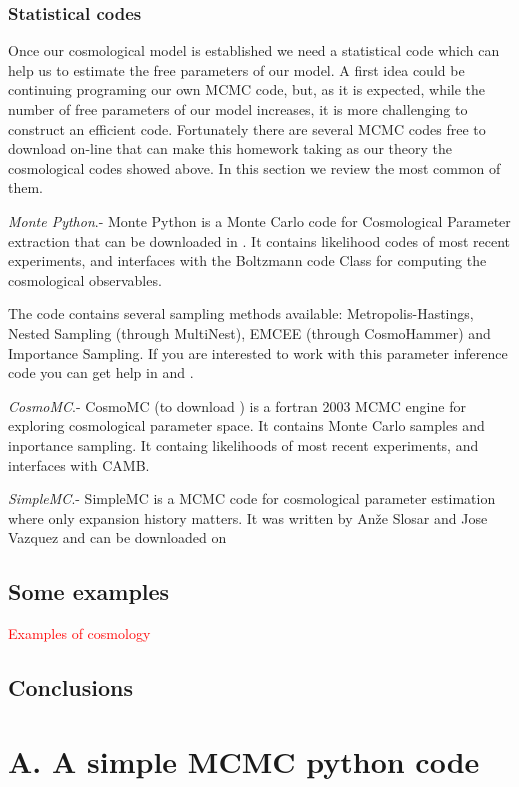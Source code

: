 \documentclass[onecolumn,           %
               showpacs,            %
               preprintnumbers,     %
               aps,                 %
               prl,          	    %
               letterpaper,             %
               superscriptaddress,      %
               nofootinbib,         %
               tightenlines,        %
               floats,floatfix      %
               ,usenatbib,
               ]{revtex4-1}
\begin{document}
\subsubsection{Statistical codes}

Once our cosmological model is established we need a statistical code which can help us to estimate the free parameters of our model. A first idea could be continuing programing our own MCMC code, but, as it is expected, while the number of free parameters of our model increases, it is more challenging to construct an efficient code. Fortunately there are several MCMC codes free to download on-line that can make this homework taking as our theory the cosmological codes showed above. In this section we review the most common of them.

\textit{Monte Python}.-
Monte Python is a Monte Carlo code for Cosmological Parameter extraction  that can be downloaded in \cite{MP1}. It contains likelihood codes of most recent experiments, and interfaces with the Boltzmann code Class for computing the cosmological observables.

The code contains several sampling methods available: Metropolis-Hastings, Nested Sampling (through MultiNest), EMCEE (through CosmoHammer) and Importance Sampling. If you are interested to work with this parameter inference code you can get help in \cite{mont1} and \cite{MP2}.

\textit{CosmoMC}.- CosmoMC (to download \cite{cosmomc}) is a fortran 2003 MCMC engine for exploring cosmological parameter space. It contains Monte Carlo samples and inportance sampling. It containg likelihoods of most recent experiments, and interfaces with CAMB.

\textit{SimpleMC}.- SimpleMC is a MCMC code for cosmological parameter estimation where only expansion history matters. It was written by Anže Slosar and Jose Vazquez and can be downloaded on \cite{simplemc}

\subsection{Some examples}
\textcolor{red}{Examples of cosmology}
\subsection{Conclusions}
\appendix
\section{A. A simple MCMC python code}
\end{document}
